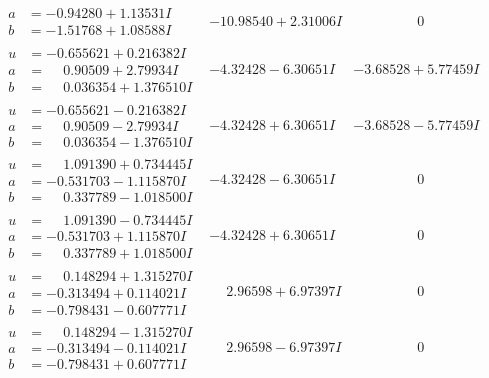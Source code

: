 \documentclass[1p]{elsarticle_modified}
\theoremstyle{definition}
\begin{document}
$$\begin{array}{c|c|c}
\begin{aligned}
a &= -0.94280 + 1.13531 I \\
b &= -1.51768 + 1.08588 I\end{aligned}
 & -10.98540 + 2.31006 I & \phantom{-0.000000 } 0 \\ \hline\begin{aligned}
u &= -0.655621 + 0.216382 I \\
a &= \phantom{-}0.90509 + 2.79934 I \\
b &= \phantom{-}0.036354 + 1.376510 I\end{aligned}
 & -4.32428 - 6.30651 I & -3.68528 + 5.77459 I \\ \hline\begin{aligned}
u &= -0.655621 - 0.216382 I \\
a &= \phantom{-}0.90509 - 2.79934 I \\
b &= \phantom{-}0.036354 - 1.376510 I\end{aligned}
 & -4.32428 + 6.30651 I & -3.68528 - 5.77459 I \\ \hline\begin{aligned}
u &= \phantom{-}1.091390 + 0.734445 I \\
a &= -0.531703 - 1.115870 I \\
b &= \phantom{-}0.337789 - 1.018500 I\end{aligned}
 & -4.32428 - 6.30651 I & \phantom{-0.000000 } 0 \\ \hline\begin{aligned}
u &= \phantom{-}1.091390 - 0.734445 I \\
a &= -0.531703 + 1.115870 I \\
b &= \phantom{-}0.337789 + 1.018500 I\end{aligned}
 & -4.32428 + 6.30651 I & \phantom{-0.000000 } 0 \\ \hline\begin{aligned}
u &= \phantom{-}0.148294 + 1.315270 I \\
a &= -0.313494 + 0.114021 I \\
b &= -0.798431 - 0.607771 I\end{aligned}
 & \phantom{-}2.96598 + 6.97397 I & \phantom{-0.000000 } 0 \\ \hline\begin{aligned}
u &= \phantom{-}0.148294 - 1.315270 I \\
a &= -0.313494 - 0.114021 I \\
b &= -0.798431 + 0.607771 I\end{aligned}
 & \phantom{-}2.96598 - 6.97397 I & \phantom{-0.000000 } 0 \\ \hline\begin{aligned}

\end{aligned}
\end{array}$$
\end{document}
